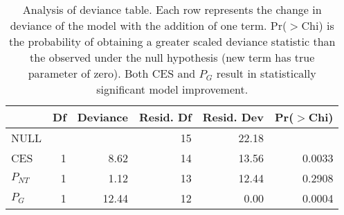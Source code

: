 \begin{table}[ht]
\centering
\begin{tabular}{lrrrrr}
  \hline
 & Df & Deviance & Resid. Df & Resid. Dev & Pr($>$Chi) \\ 
  \hline
NULL &  &  & 15 & 22.18 &  \\ 
  CES & 1 & 8.62 & 14 & 13.56 & 0.0033 \\ 
  $P_{NT}$ & 1 & 1.12 & 13 & 12.44 & 0.2908 \\ 
  $P_G$ & 1 & 12.44 & 12 & 0.00 & 0.0004 \\ 
   \hline
\end{tabular}
\caption{Analysis of deviance table. Each row represents the change in
	deviance of the model with the addition of one term. Pr($>$Chi) is the
	probability of obtaining a greater scaled deviance statistic than
	the observed under the null hypothesis (new term has true parameter of
	zero). Both CES and $P_{G}$ result in statistically significant model
	improvement.} 
\label{aod}
\end{table}
